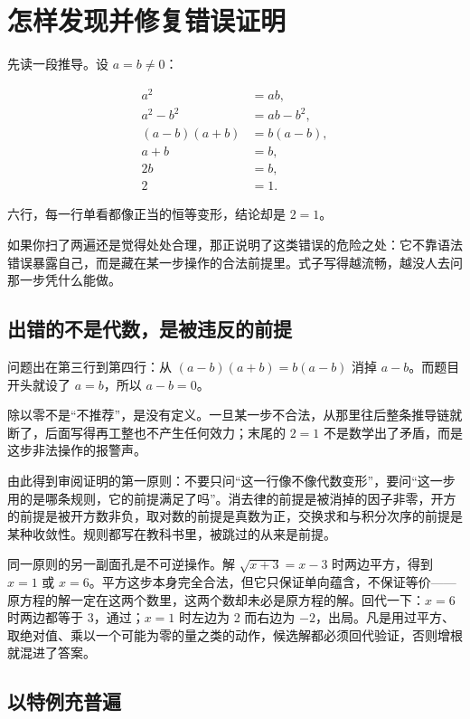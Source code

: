 \section{怎样发现并修复错误证明}
\label{sec:01-Mathematical-Language/03-Proof-Techniques/04}

先读一段推导。设 \(a=b\ne0\)：

\[
\begin{aligned}
a^2 &= ab,\\
a^2-b^2 &= ab-b^2,\\
(a-b)(a+b) &= b(a-b),\\
a+b &= b,\\
2b &= b,\\
2 &= 1.
\end{aligned}
\]

六行，每一行单看都像正当的恒等变形，结论却是 \(2=1\)。

如果你扫了两遍还是觉得处处合理，那正说明了这类错误的危险之处：它不靠语法错误暴露自己，而是藏在某一步操作的合法前提里。式子写得越流畅，越没人去问那一步凭什么能做。

\subsection{出错的不是代数，是被违反的前提}

问题出在第三行到第四行：从 \((a-b)(a+b)=b(a-b)\) 消掉 \(a-b\)。而题目开头就设了 \(a=b\)，所以 \(a-b=0\)。

除以零不是``不推荐''，是没有定义。一旦某一步不合法，从那里往后整条推导链就断了，后面写得再工整也不产生任何效力；末尾的 \(2=1\) 不是数学出了矛盾，而是这步非法操作的报警声。

由此得到审阅证明的第一原则：不要只问``这一行像不像代数变形''，要问``这一步用的是哪条规则，它的前提满足了吗''。消去律的前提是被消掉的因子非零，开方的前提是被开方数非负，取对数的前提是真数为正，交换求和与积分次序的前提是某种收敛性。规则都写在教科书里，被跳过的从来是前提。

同一原则的另一副面孔是不可逆操作。解 \(\sqrt{x+3}=x-3\) 时两边平方，得到 \(x=1\) 或 \(x=6\)。平方这步本身完全合法，但它只保证单向蕴含，不保证等价——原方程的解一定在这两个数里，这两个数却未必是原方程的解。回代一下：\(x=6\) 时两边都等于 3，通过；\(x=1\) 时左边为 2 而右边为 \(-2\)，出局。凡是用过平方、取绝对值、乘以一个可能为零的量之类的动作，候选解都必须回代验证，否则增根就混进了答案。

\subsection{以特例充普遍}

